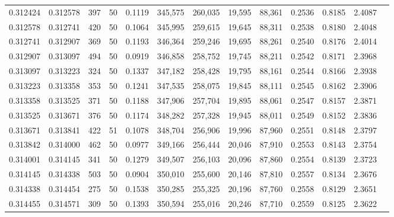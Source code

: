 \begin{tabular}{rrrrrrrrrrrrr}
0.312424 & 0.312578 &   397 &  50 &                                     0.1119 & 345,575 & 260,035 &  19,595 &  88,361 & 0.2536 & 0.8185 & 2.4087 \\
0.312578 & 0.312741 &   420 &  50 &                                     0.1064 & 345,995 & 259,615 &  19,645 &  88,311 & 0.2538 & 0.8180 & 2.4048 \\
0.312741 & 0.312907 &   369 &  50 &                                     0.1193 & 346,364 & 259,246 &  19,695 &  88,261 & 0.2540 & 0.8176 & 2.4014 \\
0.312907 & 0.313097 &   494 &  50 &                                     0.0919 & 346,858 & 258,752 &  19,745 &  88,211 & 0.2542 & 0.8171 & 2.3968 \\
0.313097 & 0.313223 &   324 &  50 &                                     0.1337 & 347,182 & 258,428 &  19,795 &  88,161 & 0.2544 & 0.8166 & 2.3938 \\
0.313223 & 0.313358 &   353 &  50 &                                     0.1241 & 347,535 & 258,075 &  19,845 &  88,111 & 0.2545 & 0.8162 & 2.3906 \\
0.313358 & 0.313525 &   371 &  50 &                                     0.1188 & 347,906 & 257,704 &  19,895 &  88,061 & 0.2547 & 0.8157 & 2.3871 \\
0.313525 & 0.313671 &   376 &  50 &                                     0.1174 & 348,282 & 257,328 &  19,945 &  88,011 & 0.2549 & 0.8152 & 2.3836 \\
0.313671 & 0.313841 &   422 &  51 &                                     0.1078 & 348,704 & 256,906 &  19,996 &  87,960 & 0.2551 & 0.8148 & 2.3797 \\
0.313842 & 0.314000 &   462 &  50 &                                     0.0977 & 349,166 & 256,444 &  20,046 &  87,910 & 0.2553 & 0.8143 & 2.3754 \\
0.314001 & 0.314145 &   341 &  50 &                                     0.1279 & 349,507 & 256,103 &  20,096 &  87,860 & 0.2554 & 0.8139 & 2.3723 \\
0.314145 & 0.314338 &   503 &  50 &                                     0.0904 & 350,010 & 255,600 &  20,146 &  87,810 & 0.2557 & 0.8134 & 2.3676 \\
0.314338 & 0.314454 &   275 &  50 &                                     0.1538 & 350,285 & 255,325 &  20,196 &  87,760 & 0.2558 & 0.8129 & 2.3651 \\
0.314455 & 0.314571 &   309 &  50 &                                     0.1393 & 350,594 & 255,016 &  20,246 &  87,710 & 0.2559 & 0.8125 & 2.3622 \\

\end{tabular}
